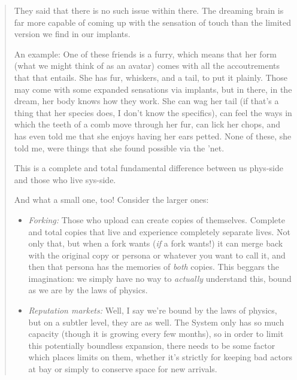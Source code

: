 \begin{quote}
They said that there is no such issue within there. The dreaming brain is far more capable of coming up with the sensation of touch than the limited version we find in our implants.

An example: One of these friends is a furry, which means that her form (what we might think of as an avatar) comes with all the accoutrements that that entails. She has fur, whiskers, and a tail, to put it plainly. Those may come with some expanded sensations via implants, but in there, in the dream, her body knows how they work. She can wag her tail (if that's a thing that her species does, I don't know the specifics), can feel the ways in which the teeth of a comb move through her fur, can lick her chops, and has even told me that she enjoys having her ears petted. None of these, she told me, were things that she found possible via the 'net.

This is a complete and total fundamental difference between us phys-side and those who live sys-side.

And what a small one, too! Consider the larger ones:

\begin{itemize}
\item
  \emph{Forking:} Those who upload can create copies of themselves. Complete and total copies that live and experience completely separate lives. Not only that, but when a fork wants (\emph{if} a fork wants!) it can merge back with the original copy or persona or whatever you want to call it, and then that persona has the memories of \emph{both} copies. This beggars the imagination: we simply have no way to \emph{actually} understand this, bound as we are by the laws of physics.
\item
  \emph{Reputation markets:} Well, I say we're bound by the laws of physics, but on a subtler level, they are as well. The System only has so much capacity (though it is growing every few months), so in order to limit this potentially boundless expansion, there needs to be some factor which places limits on them, whether it's strictly for keeping bad actors at bay or simply to conserve space for new arrivals.


\end{itemize}
\end{quote}
